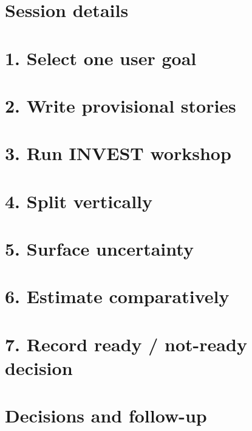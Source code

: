 \documentclass[11pt,letterpaper]{article}
\begin{document}
\section{Session details}
\section{1. Select one user goal}
\section{2. Write provisional stories}
\clearpage
\section{3. Run INVEST workshop}
\section{4. Split vertically}
\clearpage
\section{5. Surface uncertainty}
\section{6. Estimate comparatively}
\clearpage
\section{7. Record ready / not-ready decision}
\section{Decisions and follow-up}
\end{document}

